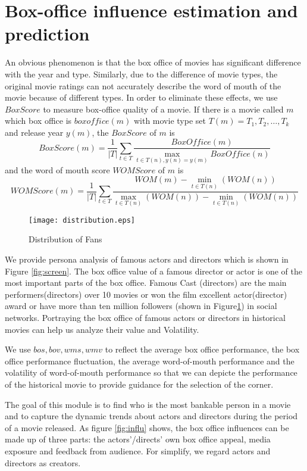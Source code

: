 \section{Box-office influence estimation and prediction}
\label{sec:impact}
An obvious phenomenon is that the box office of movies has significant difference with the year and type.  Similarly, due to the difference of movie types, the original movie ratings can not accurately describe the word of mouth of the movie because of different types. In order to eliminate these effects, we use $BoxScore$ to measure box-office quality of a movie. If there is a movie called $m$ which box office is $boxoffice(m)$ with movie type set $T(m)={T_1,T_2,\ldots,T_k}$ and release year $y(m)$, the $BoxScore$ of $m$ is 
\begin{equation}
BoxScore(m)=\frac{1}{|T|}\sum_{t\in T}\frac{BoxOffice(m)}{\max_{t\in T(n),y(n)=y(m)}BoxOffice(n)}
\end{equation}
and the word of mouth score $WOMScore$ of $m$ is 
\begin{equation}
WOMScore(m)=\frac{1}{|T|}\sum_{t\in T}\frac{WOM(m)-\min_{t\in T(n)}(WOM(n))}{\max_{t\in T(n)}(WOM(n))-\min_{t\in T(n)}(WOM(n))}
\end{equation}
\begin{figure}[!htbp]
\centering
\texttt{[image: distribution.eps]}
\caption{Distribution of Fans}
\label{fig:dist}
\end{figure}
\par We provide persona analysis of famous actors and directors which is shown in Figure \ref{fig:screen}. The box office value of a famous director or actor is one of the most important parts of the box office. Famous Cast (directors) are the main performers(directors) over 10 movies or won the film excellent actor(director) award or have more than ten million followers (shown in Figure\ref{fig:dist}) in social networks. Portraying the box office of famous actors or directors in historical movies can help us analyze their value and Volatility.
\par We use $bos,bov,wms,wmv$ to reflect the average box office performance, the box office performance fluctuation, the average word-of-mouth performance and the volatility of word-of-mouth performance so that we can depicte the performance of the historical movie to provide guidance for the selection of the corner. 
\par The goal of this module is to find who is the most bankable person in a movie and to capture the dynamic trends about actors and directors during the period of a movie released. As figure \ref{fig:influ} shows, the box office influences can be made up of three parts: the actors'/directs' own box office appeal, media exposure and feedback from audience. For simplify, we regard actors and directors as creators.
